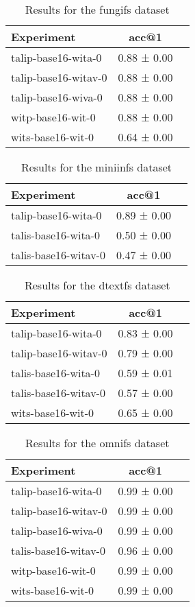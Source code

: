 \begin{table}[htbp]
\caption{Results for the fungifs dataset}
\begin{tabular}{|l|c|c|}\hline
Experiment & acc@1\\
\hline
talip-base16-wita-0 & 0.88 ± 0.00\\
\hline
talip-base16-witav-0 & 0.88 ± 0.00\\
\hline
talip-base16-wiva-0 & 0.88 ± 0.00\\
\hline
witp-base16-wit-0 & 0.88 ± 0.00\\
\hline
wits-base16-wit-0 & 0.64 ± 0.00\\
\hline
\end{tabular}
\end{table}

\begin{table}[htbp]
\caption{Results for the miniinfs dataset}
\begin{tabular}{|l|c|c|}\hline
Experiment & acc@1\\
\hline
talip-base16-wita-0 & 0.89 ± 0.00\\
\hline
talis-base16-wita-0 & 0.50 ± 0.00\\
\hline
talis-base16-witav-0 & 0.47 ± 0.00\\
\hline
\end{tabular}
\end{table}

\begin{table}[htbp]
\caption{Results for the dtextfs dataset}
\begin{tabular}{|l|c|c|}\hline
Experiment & acc@1\\
\hline
talip-base16-wita-0 & 0.83 ± 0.00\\
\hline
talip-base16-witav-0 & 0.79 ± 0.00\\
\hline
talis-base16-wita-0 & 0.59 ± 0.01\\
\hline
talis-base16-witav-0 & 0.57 ± 0.00\\
\hline
wits-base16-wit-0 & 0.65 ± 0.00\\
\hline
\end{tabular}
\end{table}

\begin{table}[htbp]
\caption{Results for the omnifs dataset}
\begin{tabular}{|l|c|c|}\hline
Experiment & acc@1\\
\hline
talip-base16-wita-0 & 0.99 ± 0.00\\
\hline
talip-base16-witav-0 & 0.99 ± 0.00\\
\hline
talip-base16-wiva-0 & 0.99 ± 0.00\\
\hline
talis-base16-witav-0 & 0.96 ± 0.00\\
\hline
witp-base16-wit-0 & 0.99 ± 0.00\\
\hline
wits-base16-wit-0 & 0.99 ± 0.00\\
\hline
\end{tabular}
\end{table}


